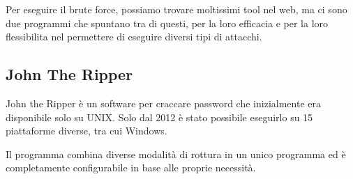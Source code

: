 Per eseguire il brute force, possiamo trovare moltissimi tool nel web, ma ci sono due programmi che spuntano tra di questi, per la loro efficacia e per la loro flessibilita nel permettere di eseguire diversi tipi di attacchi.

\subsection{John The Ripper}

John the Ripper è un software per craccare password che inizialmente era disponibile solo su UNIX. Solo dal 2012 è stato possibile eseguirlo su 15 piattaforme diverse, tra cui Windows.

Il programma combina diverse modalità di rottura in un unico programma ed è completamente configurabile in base alle proprie necessità.

